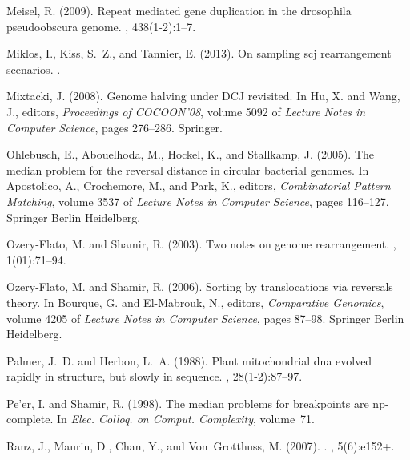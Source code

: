 \documentclass[11pt,final,twoside,nofrench]{thlifl}
\begin{document}
{\begin{thebibliography}{}
Meisel, R. (2009).
\newblock Repeat mediated gene duplication in the drosophila pseudoobscura
  genome.
, 438(1-2):1--7.

Miklos, I., Kiss, S.~Z., and Tannier, E. (2013).
\newblock On sampling scj rearrangement scenarios.
.

Mixtacki, J. (2008).
\newblock Genome halving under {DCJ} revisited.
\newblock In Hu, X. and Wang, J., editors, {\em Proceedings of COCOON'08},
  volume 5092 of {\em Lecture Notes in Computer Science}, pages 276--286.
  Springer.

Ohlebusch, E., Abouelhoda, M., Hockel, K., and Stallkamp, J. (2005).
\newblock The median problem for the reversal distance in circular bacterial
  genomes.
\newblock In Apostolico, A., Crochemore, M., and Park, K., editors, {\em
  Combinatorial Pattern Matching}, volume 3537 of {\em Lecture Notes in
  Computer Science}, pages 116--127. Springer Berlin Heidelberg.

Ozery-Flato, M. and Shamir, R. (2003).
\newblock Two notes on genome rearrangement.
,
  1(01):71--94.

Ozery-Flato, M. and Shamir, R. (2006).
\newblock Sorting by translocations via reversals theory.
\newblock In Bourque, G. and El-Mabrouk, N., editors, {\em Comparative
  Genomics}, volume 4205 of {\em Lecture Notes in Computer Science}, pages
  87--98. Springer Berlin Heidelberg.

Palmer, J.~D. and Herbon, L.~A. (1988).
\newblock Plant mitochondrial dna evolved rapidly in structure, but slowly in
  sequence.
, 28(1-2):87--97.

Pe’er, I. and Shamir, R. (1998).
\newblock The median problems for breakpoints are np-complete.
\newblock In {\em Elec. Colloq. on Comput. Complexity}, volume~71.

Ranz, J., Maurin, D., Chan, Y., and Von~Grotthuss, M. (2007).
.
, 5(6):e152+.


\end{thebibliography}}
\end{document}
